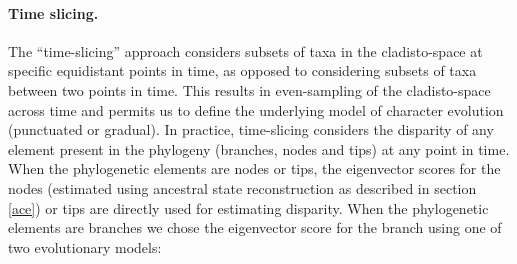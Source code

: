 \documentclass[12pt,a4paper]{article}
\begin{document}
\paragraph{Time slicing.}
The ``time-slicing'' approach considers subsets of taxa in the cladisto-space at specific equidistant points in time, as opposed to considering subsets of taxa between two points in time.
This results in even-sampling of the cladisto-space across time and permits us to define the underlying model of character evolution (punctuated or gradual).  
In practice, time-slicing considers the disparity of any element present in the phylogeny (branches, nodes and tips) at any point in time.
When the phylogenetic elements are nodes or tips, the eigenvector scores for the nodes (estimated using ancestral state reconstruction as described in section \ref{ace}) or tips are directly used for estimating disparity.
When the phylogenetic elements are branches we chose the eigenvector score for the branch using one of two evolutionary models:
\end{document}
